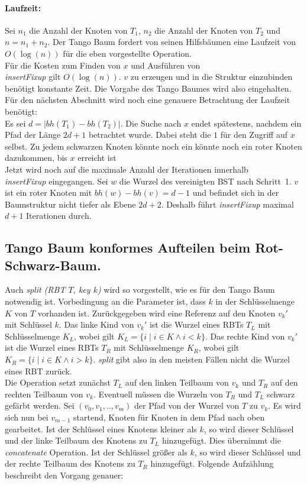 \documentclass[a4paper,12pt]{article}
\begin{document}
\paragraph{Laufzeit:}
Sei $n_1$ die Anzahl der Knoten von $T_1$, $n_2$ die Anzahl der Knoten von $T_2$ und $n = n_1 + n_2$. Der Tango Baum fordert von seinen Hilfsbäumen eine Laufzeit von $O(\log \left(n\right))$ für die eben vorgestellte Operation.\\ Für die Kosten zum Finden von $x$ und Ausführen von \\ \textit{insertFixup}  gilt $O(\log (n))$. $v$ zu erzeugen und in die Struktur einzubinden benötigt konstante Zeit. 
Die Vorgabe des Tango Baumes wird also eingehalten.\\
Für den nächsten Abschnitt wird noch eine genauere Betrachtung der Laufzeit benötigt:\\ Es sei $d = \vert \mathit{bh}(T_1) - \mathit{bh}(T_2)  \vert $. Die Suche nach $x$ endet spätestens, nachdem ein Pfad der Länge $2d + 1$ betrachtet wurde. Dabei steht die $1$ für den Zugriff auf $x$ selbst. Zu jedem schwarzen Knoten könnte noch ein könnte noch ein roter Knoten dazukommen, bis $x$ erreicht ist\\
 Jetzt wird noch auf die maximale Anzahl der Iterationen innerhalb \\ \textit{insertFixup} eingegangen.
 Sei $w$ die Wurzel des vereinigten BST nach \mbox{Schritt 1}. $v$ ist ein roter Knoten mit $\mathit{bh}(w) - \mathit{bh}(v) = d - 1$ und befindet sich in der Baumstruktur nicht tiefer als Ebene $2d + 2$. Deshalb führt \textit{insertFixup} maximal $d + 1$ Iterationen durch.  

\subsection{Tango Baum konformes Aufteilen beim Rot-Schwarz-Baum.}
Auch \textit{split (RBT $T$, key $k$)} wird so vorgestellt, wie es für den Tango Baum notwendig ist. Vorbedingung an die Parameter ist, dass $k$ in der Schlüsselmenge $K$ von $T$ vorhanden ist. Zurückgegeben wird eine Referenz auf den Knoten ${v_k}'$ mit Schlüssel $k$. Das linke Kind von ${v_k}'$ ist die Wurzel eines RBTs $T_L$ mit Schlüsselmenge $K_L$, wobei gilt ${K_L=\{i \mid  i\in K \land i <k\}}$. Das rechte Kind von ${v_k}'$ ist die Wurzel eines RBTs $T_R$ mit Schlüsselmenge $K_R$, wobei gilt ${K_R = \{i \mid i\in K \land i > k\}}$. \textit{split} gibt also in den meisten Fällen nicht die Wurzel eines RBT zurück.\\ Die Operation setzt zunächst $T_L$ auf den linken Teilbaum von $v_k$ und $T_R$ auf den rechten Teilbaum von $v_k$. Eventuell müssen die Wurzeln von $T_R$ und $T_L$ schwarz gefärbt werden. Sei $(v_0,v_1,..,v_m)$  der Pfad von der Wurzel von $T$ zu $v_k$. Es wird sich nun bei $v_{m-1}$ startend, Knoten für Knoten in dem Pfad nach oben gearbeitet. Ist der Schlüssel eines Knotens kleiner als $k$, so wird dieser Schlüssel und der linke Teilbaum des Knotens zu $T_L$ hinzugefügt. Dies übernimmt die \textit{concatenate} Operation. Ist der Schlüssel größer als $k$, so wird dieser Schlüssel und der rechte Teilbaum des Knotens zu $T_R$ hinzugefügt. Folgende Aufzählung beschreibt den Vorgang genauer:
\end{document}
